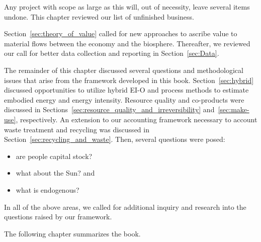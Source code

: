 Any project with scope as large as this will, out of necessity, leave
several items undone.
This chapter reviewed our list of unfinished business.

Section~\ref{sec:theory_of_value} called for new approaches
to ascribe value to material flows between the economy and the biosphere.
Thereafter, we reviewed our call for better data collection and reporting
in Section~\ref{sec:Data}.

The remainder of this chapter discussed several questions
and methodological issues that arise from the framework
developed in this book.
Section~\ref{sec:hybrid} discussed opportunities to utilize hybrid EI-O and process methods
to estimate embodied energy and energy intensity.
Resource quality and co-products were discussed 
in Sections~\ref{sec:resource_quality_and_irreversibility}
and~\ref{sec:make-use}, respectively.
An extension to our accounting framework necessary to account
waste treatment and recycling was discussed in Section~\ref{sec:recycling_and_waste}.
Then, several questions were posed:
%
\begin{itemize}
	\item{are people capital stock?}
	
	\item{what about the Sun? and}
	
	\item{what is endogenous?}
\end{itemize}
%
In all of the above areas, we called for additional 
inquiry and research 
into the questions raised by our framework.

The following chapter summarizes the book. 








%
%

